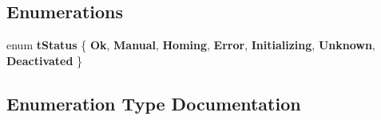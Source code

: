 \subsection*{\-Enumerations}
\begin{DoxyCompactItemize}
\item 
enum {\bf t\-Status} \{ \*
{\bf \-Ok}, 
{\bf \-Manual}, 
{\bf \-Homing}, 
{\bf \-Error}, 
\*
{\bf \-Initializing}, 
{\bf \-Unknown}, 
{\bf \-Deactivated}
 \}
\end{DoxyCompactItemize}


\subsection{\-Enumeration \-Type \-Documentation}
